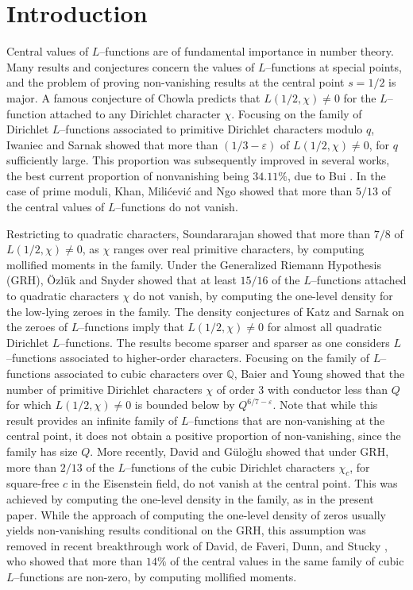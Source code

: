 \documentclass[12pt]{amsart}
\begin{document}
\section{Introduction}
Central values of $L$--functions are of fundamental importance in number theory. Many results and conjectures concern the values of $L$--functions at special points, and the problem of proving non-vanishing results at the central point $s=1/2$ is major. A famous conjecture of Chowla predicts that $L(1/2,\chi) \neq 0$ for the $L$--function attached to any Dirichlet character $\chi$.
Focusing on the family of Dirichlet $L$--functions associated to primitive Dirichlet characters modulo $q$, Iwaniec and Sarnak \cite{is} showed that more than $(1/3-\varepsilon)$ of $L(1/2,\chi) \neq 0$, for $q$ sufficiently large. This proportion was subsequently improved in several works, the best current proportion of nonvanishing being $34.11\%$, due to Bui \cite{bui}. In the case of prime moduli, Khan, Mili\'cevi\'c and Ngo \cite{kmn} showed that more than $5/13$ of the central values of $L$--functions do not vanish.

Restricting to quadratic characters, Soundararajan \cite{Sound} showed that more than $7/8$ of $L(1/2,\chi) \neq 0$, as $\chi$ ranges over real primitive characters, by computing mollified moments in the family. Under the Generalized Riemann Hypothesis (GRH), \"Ozl\"uk and Snyder \cite{OS} showed that at least $15/16$ of the $L$--functions attached to quadratic characters $\chi$ do not vanish, by computing the one-level density for the low-lying zeroes in the family. The density conjectures of Katz and Sarnak \cite{KS} on the zeroes of $L$--functions imply
that $L(1/2, \chi) \neq 0$ for almost all quadratic Dirichlet $L$--functions. The results become sparser and sparser as one considers $L$--functions associated to higher-order characters. Focusing on the family of $L$--functions associated to cubic characters over $\mathbb{Q}$, Baier and Young \cite{BY} showed that the number of primitive Dirichlet characters $\chi$ of order $3$ with conductor less than $Q$ for which $L(1/2,\chi) \neq 0$ is bounded below by $Q^{6/7-\varepsilon}$. Note that while this result provides an infinite family of $L$--functions that are non-vanishing at the central point, it does not obtain a positive proportion of non-vanishing, since the family has size $Q$. More recently, David and G\"ulo\u{g}lu \cite{dg} showed that under GRH, more than $2/13$ of the $L$--functions of the  cubic Dirichlet characters $\chi_c$, for square-free $c$ in the Eisenstein field, do not vanish at the central point. This was achieved by computing the one-level density in the family, as in the present paper. While the approach of computing the one-level density of zeros usually yields non-vanishing results conditional on the GRH, this assumption was removed in recent breakthrough work of David, de Faveri, Dunn, and Stucky \cite{ddds}, who showed that more than $14\%$ of the central values in the same family of cubic $L$--functions are non-zero, by computing mollified moments.
\end{document}
